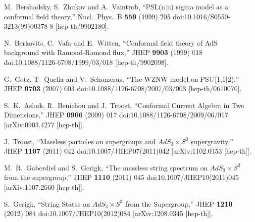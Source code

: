 \documentclass[12pt]{article}
\numberwithin{equation}{section}
\numberwithin{equation}{section}
\numberwithin{table}{section}\setlength{\multlinegap}{25pt}
\begin{document}
\begin{thebibliography}{99}
  M.~Bershadsky, S.~Zhukov and A.~Vaintrob,
  ``PSL(n$|$n) sigma model as a conformal field theory,''
  Nucl.\ Phys.\ B {\bf 559} (1999) 205
  doi:10.1016/S0550-3213(99)00378-8
  [hep-th/9902180].


  N.~Berkovits, C.~Vafa and E.~Witten,
  ``Conformal field theory of AdS background with Ramond-Ramond flux,''
  JHEP {\bf 9903} (1999) 018
  doi:10.1088/1126-6708/1999/03/018
  [hep-th/9902098].

  G.~Gotz, T.~Quella and V.~Schomerus,
  ``The WZNW model on PSU(1,1$|$2),''
  JHEP {\bf 0703} (2007) 003
  doi:10.1088/1126-6708/2007/03/003
  [hep-th/0610070].

  S.~K.~Ashok, R.~Benichou and J.~Troost,
 ``Conformal Current Algebra in Two Dimensions,''
  JHEP {\bf 0906} (2009) 017
  doi:10.1088/1126-6708/2009/06/017
  [arXiv:0903.4277 [hep-th]].

  J.~Troost,
  ``Massless particles on supergroups and $AdS_3 \times S^3$ supergravity,''
  JHEP {\bf 1107} (2011) 042
  doi:10.1007/JHEP07(2011)042
  [arXiv:1102.0153 [hep-th]].

  M.~R.~Gaberdiel and S.~Gerigk,
  ``The massless string spectrum on $AdS_3 \times S^3$ from the supergroup,''
  JHEP {\bf 1110} (2011) 045
  doi:10.1007/JHEP10(2011)045
  [arXiv:1107.2660 [hep-th]].

  S.~Gerigk,
  ``String States on $AdS_3 \times S^3$ from the Supergroup,''
  JHEP {\bf 1210} (2012) 084
  doi:10.1007/JHEP10(2012)084
  [arXiv:1208.0345 [hep-th]].



\end{thebibliography}
\end{document}
